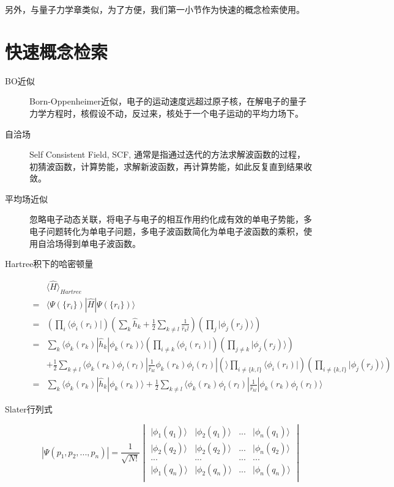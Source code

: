 \documentclass[12pt,a4paper,openany,twoside]{book}
\numberwithin{equation}{section}
\newcommand{\bra}[1]{\langle #1 |}
\newcommand{\ket}[1]{| #1 \rangle}
\newcommand{\bracketl}[3]{\langle #1 | #2 | #3 \rangle}
\newcommand{\mean}[1]{\langle #1 \rangle}
\begin{document}
    另外，与量子力学章类似，为了方便，我们第一小节作为快速的概念检索使用。

    \section{快速概念检索}
    \begin{description}
      \item[BO近似] Born-Oppenheimer近似，电子的运动速度远超过原子核，在解电子的量子力学方程时，核假设不动，反过来，核处于一个电子运动的平均力场下。
       
      \item[自洽场] Self Consistent Field, SCF, 通常是指通过迭代的方法求解波函数的过程，初猜波函数，计算势能，求解新波函数，再计算势能，如此反复直到结果收敛。
      
      \item[平均场近似] 忽略电子动态关联，将电子与电子的相互作用约化成有效的单电子势能，多电子问题转化为单电子问题，多电子波函数简化为单电子波函数的乘积，使用自洽场得到单电子波函数。
       
      \item[Hartree积下的哈密顿量] 
      \begin{align*}
        &\mean{\hat{H}}_{Hartree} \\
        =& \bracketl{\Psi(\{r_i\})}{\hat{H}}{\Psi(\{r_i\})}\\
        =&(\prod_i\bra{\phi_i(r_i)})(\sum_k\hat{h}_k+\frac{1}{2}\sum_{k\neq l}\frac{1}{\hat{r}_kl})(\prod_j\ket{\phi_j(r_j)})\\
        =&\sum_k\bracketl{\phi_k(r_k)}{\hat{h}_k}{\phi_k(r_k)}(\prod_{i\neq k}\bra{\phi_i(r_i)})(\prod_{j \neq k}\ket{\phi_j(r_j)})\\
        &+\frac{1}{2}\sum_{k \neq l}\bracketl{\phi_k(r_k)\phi_l(r_l)}{\frac{1}{\hat{r}_{kl}}\phi_k(r_k)\phi_l(r_l)}(\prod_{i \neq \{k,l\}}\bra{\phi_i(r_i)})(\prod_{i \neq \{k,l\}}\ket{\phi_j(r_j)})\\
        =&\sum_k\bracketl{\phi_k(r_k)}{\hat{h}_k}{\phi_k(r_k)}+\frac{1}{2}\sum_{k \neq l}\bracketl{\phi_k(r_k)\phi_l(r_l)}{\frac{1}{\hat{r}_{kl}}}{\phi_k(r_k)\phi_l(r_l)}
      \end{align*} 

      \item[Slater行列式]
      \begin{equation}
        |\Psi(p_1,p_2,...,p_n)|=\frac{1}{\sqrt{N!}}
        \begin{vmatrix}
        \ket{\phi_1(q_1)} & \ket{\phi_2(q_1)} & ... & \ket{\phi_n(q_1)}\\
        \ket{\phi_2(q_2)} & \ket{\phi_2(q_2)} & ... & \ket{\phi_n(q_2)}\\
        ... & ...& ... & ...\\
        \ket{\phi_1(q_n)} & \ket{\phi_2(q_n)} & ... & \ket{\phi_n(q_n)}\\
        \end{vmatrix}
      \end{equation}
  

\end{description}
\end{document}
